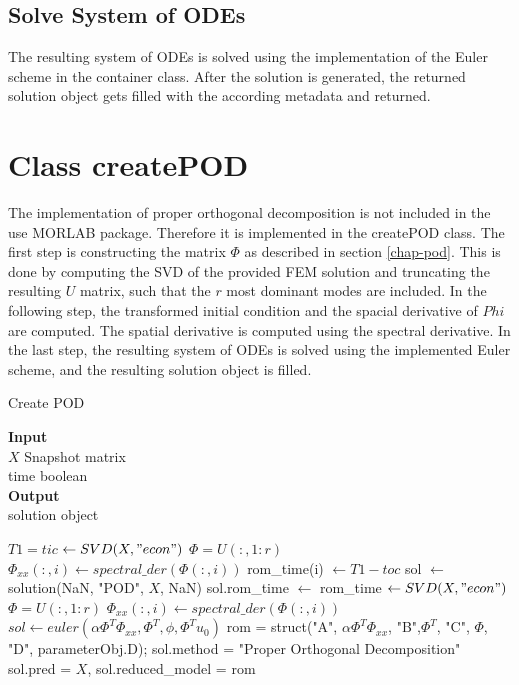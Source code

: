 \subsection{Solve System of ODEs}
The resulting system of ODEs is solved using the implementation of the Euler scheme in the container class.
After the solution is generated, the returned solution object gets filled with the according metadata and returned.

\section{Class createPOD}
The implementation of proper orthogonal decomposition is not included in the use MORLAB package.
Therefore it is implemented in the createPOD class.
The first step is constructing the matrix \(\Phi\) as described in section \ref{chap-pod}.
This is done by computing the SVD of the provided FEM solution and truncating the resulting \(U\) matrix, such that the \(r\) most dominant modes are included.
In the following step, the transformed initial condition and the spacial derivative of \(Phi\) are computed.
The spatial derivative is computed using the spectral derivative.
In the last step, the resulting system of ODEs is solved using the implemented Euler scheme, and the resulting solution object is filled.
\begin{algorithm}[H]
\caption{Create POD}
\textbf{Input} \\
\hspace*{\algorithmicindent} $X$ Snapshot matrix \\
\hspace*{\algorithmicindent} time boolean \\
\textbf{Output} \\
\hspace*{\algorithmicindent} solution object
\begin{algorithmic}[1]
\State $T1 = tic$
\State [$U$, $S$, $V$] $\gets SVD(X, "econ")$
\State $\Phi = U(:, 1:r)$
\State $\Phi_{xx}(:, i) \gets spectral\_der(\Phi(:, i))$
\State rom\_time(i) $\gets T1 - toc$
\EndFor
\EndFor
\State sol $\gets$ solution(NaN, "POD", $X$, NaN)
\State sol.rom\_time $\gets$ rom\_time
\EndIf
\State [$U$, $S$, $V$] $\gets SVD(X, "econ")$
\State $\Phi = U(:, 1:r)$
\State $\Phi_{xx}(:, i) \gets spectral\_der(\Phi(:, i))$
\EndFor
\State $sol \gets euler(\alpha \Phi^{T} \Phi_{xx}, \Phi^{T}, \phi, \Phi^{T} u_0)$
\State rom = struct("A", $\alpha \Phi^{T} \Phi_{xx}$, "B",$\Phi^{T}$, "C", $\Phi$, "D", parameterObj.D);
\State sol.method = "Proper Orthogonal Decomposition"
\State sol.pred = $X$, sol.reduced\_model = rom
\EndProcedure
\end{algorithmic}
\end{algorithm}
